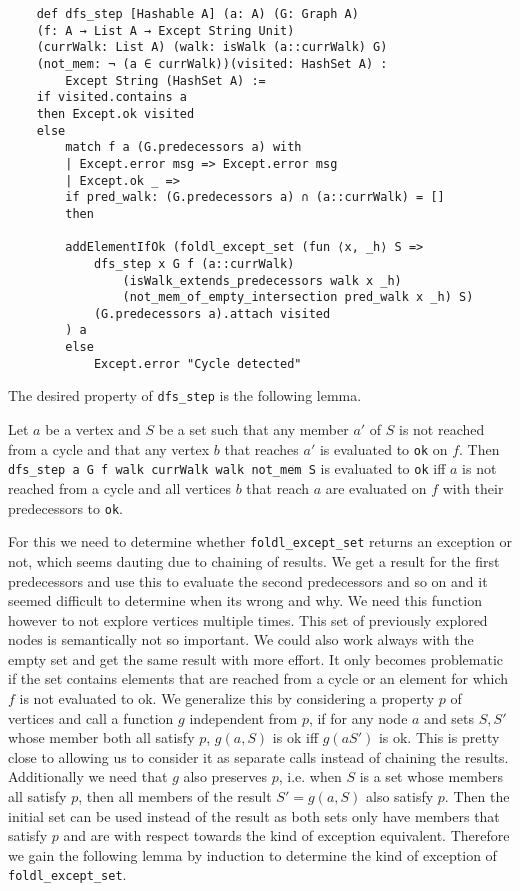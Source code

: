 \begin{lstlisting}
    def dfs_step [Hashable A] (a: A) (G: Graph A) 
    (f: A → List A → Except String Unit) 
    (currWalk: List A) (walk: isWalk (a::currWalk) G) 
    (not_mem: ¬ (a ∈ currWalk))(visited: HashSet A) :
        Except String (HashSet A) :=
    if visited.contains a
    then Except.ok visited
    else
        match f a (G.predecessors a) with
        | Except.error msg => Except.error msg
        | Except.ok _ =>
        if pred_walk: (G.predecessors a) ∩ (a::currWalk) = []
        then

        addElementIfOk (foldl_except_set (fun ⟨x, _h⟩ S =>
            dfs_step x G f (a::currWalk) 
                (isWalk_extends_predecessors walk x _h) 
                (not_mem_of_empty_intersection pred_walk x _h) S) 
            (G.predecessors a).attach visited
        ) a
        else
            Except.error "Cycle detected"
\end{lstlisting}


The desired property of \texttt{dfs\_step} is the following lemma.

\begin{lemma}\label{lem:dfsstep}
    Let $a$ be a vertex and $S$ be a set such that any member $a'$ of $S$ is not reached from a cycle and that any vertex $b$ that reaches $a'$ is evaluated to \texttt{ok} on $f$. Then \texttt{dfs\_step a G f walk currWalk walk not\_mem S} is evaluated to \texttt{ok} iff $a$ is not reached from a cycle and all vertices $b$ that reach $a$ are evaluated on $f$ with their predecessors to \texttt{ok}.
\end{lemma}

For this we need to determine whether \texttt{foldl\_except\_set} returns an exception or not, which seems dauting due to chaining of results. We get a result for the first predecessors and use this to evaluate the second predecessors and so on and it seemed difficult to determine when its wrong and why. We need this function however to not explore vertices multiple times. This set of previously explored nodes is semantically not so important. We could also work always with the empty set and get the same result with more effort. It only becomes problematic if the set contains elements that are reached from a cycle or an element for which $f$ is not evaluated to ok. We generalize this by considering a property $p$ of vertices and call a function $g$ independent from $p$, if for any node $a$ and sets $S, S'$ whose member both all satisfy $p$, $g( a, S)$ is ok iff $g( a S')$ is ok. This is pretty close to allowing us to consider it as separate calls instead of chaining the results. Additionally we need that $g$ also preserves $p$, i.e. when $S$ is a set whose members all satisfy $p$, then all members of the result $S' = g(a,S)$ also satisfy $p$. Then the initial set can be used instead of the result as both sets only have members that satisfy $p$ and are with respect towards the kind of exception equivalent. Therefore we gain the following lemma by induction to determine the kind of exception of \texttt{foldl\_except\_set}.

